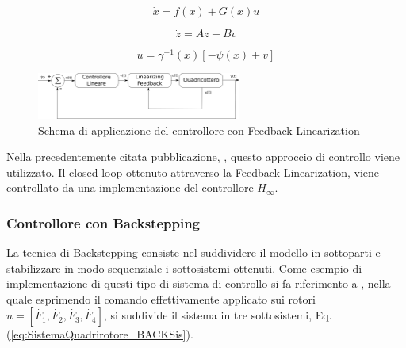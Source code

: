 \begin{equation}\label{eq:SistemaQuadrirotore_Sistemanonlin}
	\dot{x} = f(x) + G(x) u
\end{equation}

\begin{equation}\label{eq:SistemaQuadrirotore_Sistemalin}
	\dot{z} = A z + B v
\end{equation}

\begin{equation}\label{eq:SistemaQuadrirotore_FL_com}
	u = \gamma^{-1}(x) \left[- \psi(x)+v\right]
\end{equation}

\begin{figure}
	\centering
	\includegraphics[width=0.6\textwidth]{SistemaQuadrirotore/Figure/FLP}
	\caption{Schema di applicazione del controllore con Feedback Linearization}
\end{figure}

Nella precedentemente citata pubblicazione, \cite{G_inf}, questo approccio di controllo viene utilizzato. Il closed-loop ottenuto attraverso la Feedback Linearization, viene controllato da una implementazione del controllore $H_\infty$.

\subsubsection{Controllore con Backstepping}
La tecnica di Backstepping consiste nel suddividere il modello in sottoparti e stabilizzare in modo sequenziale i sottosistemi ottenuti.
Come esempio di implementazione di questi tipo di sistema di controllo si fa riferimento a \cite{Backstepping}, nella quale esprimendo il comando effettivamente applicato sui rotori $u = \left[\dot{F_1} ,\dot{F_2}, \dot{F_3},\dot{F_4} \right]$, si suddivide il sistema in tre sottosistemi, Eq. (\ref{eq:SistemaQuadrirotore_BACKSis}).

